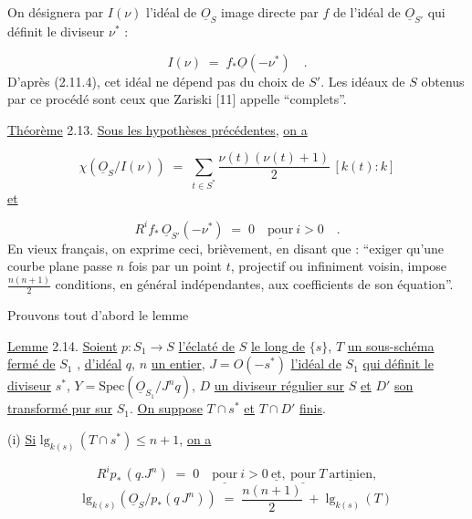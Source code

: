 On désignera par $I(\nu)$ l'idéal de $\underline{O}_S$ image directe par $f$ de l'idéal de $\underline{O}_{S'}$ qui définit le diviseur $\nu^*$ :

\begin{equation*}
I(\nu) \;=\; f_*\underline{O}(-\nu^*) \quad .
\end{equation*}
D'après (2.11.4), cet idéal ne dépend pas du choix de $S'$. Les idéaux de $S$ obtenus par ce procédé sont ceux que Zariski [11] appelle ``complets''.

\underline{Théorème} 2.13. \underline{Sous les hypothèses précédentes}, \underline{on a}

\begin{equation*}
\chi(\underline{O}_S/I(\nu)) \;=\; \sum_{t \in S^*} \frac{\nu(t)(\nu(t)+1)}{2}\,[k(t) : k]
\end{equation*}
\underline{et}

\begin{equation*}
R^i f_*\,\underline{O}_{S'}(-\nu^*) \;=\; 0 \quad \underline{\mathrm{pour}}\ i > 0 \quad .
\end{equation*}
En vieux français, on exprime ceci, brièvement, en disant que : ``exiger qu'une courbe plane passe $n$ fois par un point $t$, projectif ou infiniment voisin, impose $\frac{n(n+1)}{2}$ conditions, en général indépendantes, aux coefficients de son équation''.

Prouvons tout d'abord le lemme

\underline{Lemme} 2.14. \underline{Soient} $p : S_1 \longrightarrow S$ \underline{l'éclaté de} $S$ \underline{le long de} $\{s\}$, $T$ \underline{un sous-schéma fermé de} $S_1$ , \underline{d'idéal} $q$, $n$ \underline{un entier}, $J = O(-s^*)$ \underline{l'idéal de} $S_1$ \underline{qui définit le diviseur} $s^*$, $Y = \mathrm{Spec}(\underline{O}_{S_1}/J^n q)$, $D$ \underline{un diviseur régulier sur} $S$ \underline{et} $D'$ \underline{son transformé pur sur} $S_1$. \underline{On suppose} $T \cap s^*$ \underline{et} $T \cap D'$ \underline{finis}.

(i) \underline{Si} $\mathrm{lg}_{k(s)}\,(T \cap s^*) \leq n +1$, \underline{on a}

\begin{equation*}
R^i p_*\,(q.J^n) \;=\; 0 \quad \underline{\mathrm{pour}}\ i > 0 \ \underline{\mathrm{et}},\ \underline{\mathrm{pour}}\ T\ \underline{\mathrm{artinien}},
\end{equation*}
\begin{equation*}
\mathrm{lg}_{k(s)}(\underline{O}_S/p_*(q\,J^n)) \;=\; \frac{n(n+1)}{2} \;+\; \mathrm{lg}_{k(s)}\,(T)
\end{equation*}

